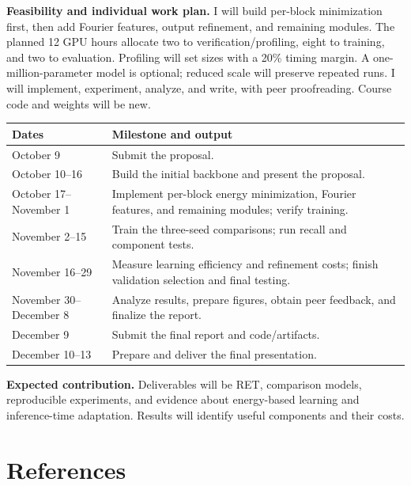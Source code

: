 \documentclass[11pt,letterpaper]{article}
\begin{document}
\textbf{Feasibility and individual work plan.} I will build per-block minimization first, then add Fourier features, output refinement, and remaining modules. The planned 12 GPU hours allocate two to verification/profiling, eight to training, and two to evaluation. Profiling will set sizes with a 20\% timing margin. A one-million-parameter model is optional; reduced scale will preserve repeated runs. I will implement, experiment, analyze, and write, with peer proofreading. Course code and weights will be new.

\smallskip\begin{tabularx}{\textwidth}{@{}p{3.2cm}X@{}}\toprule
\textbf{Dates} & \textbf{Milestone and output}\\\midrule
October 9 & Submit the proposal.\\
October 10–16 & Build the initial backbone and present the proposal.\\
October 17–November 1 & Implement per-block energy minimization, Fourier features, and remaining modules; verify training.\\
November 2–15 & Train the three-seed comparisons; run recall and component tests.\\
November 16–29 & Measure learning efficiency and refinement costs; finish validation selection and final testing.\\
November 30–December 8 & Analyze results, prepare figures, obtain peer feedback, and finalize the report.\\
December 9 & Submit the final report and code/artifacts.\\
December 10–13 & Prepare and deliver the final presentation.\\
\bottomrule\end{tabularx}\smallskip

\textbf{Expected contribution.} Deliverables will be RET, comparison models, reproducible experiments, and evidence about energy-based learning and inference-time adaptation. Results will identify useful components and their costs.

\newpage
\section*{References}
\end{document}
